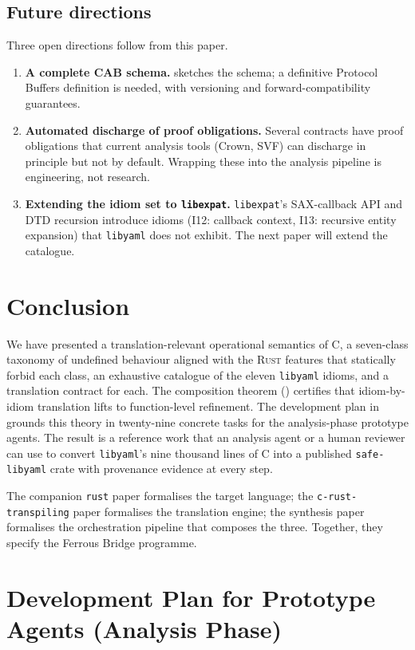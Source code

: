 \documentclass[12pt]{article}
\newcommand{\rust}{\textnormal{\textsc{Rust}}}
\newcommand{\clang}{\textnormal{\textsc{C}}}
\newcommand{\libyaml}{\texttt{libyaml}}
\newcommand{\safelibyaml}{\texttt{safe-libyaml}}
\theoremstyle{definition}
\theoremstyle{remark}
\begin{document}
\subsection{Future directions}
Three open directions follow from this paper.
\begin{enumerate}
\item \textbf{A complete CAB schema.}  sketches the schema; a definitive Protocol Buffers definition is needed, with versioning and forward-compatibility guarantees.
\item \textbf{Automated discharge of proof obligations.} Several contracts have proof obligations that current analysis tools (Crown, SVF) can discharge in principle but not by default. Wrapping these into the analysis pipeline is engineering, not research.
\item \textbf{Extending the idiom set to \texttt{libexpat}.} \texttt{libexpat}'s SAX-callback API and DTD recursion introduce idioms (I12: callback context, I13: recursive entity expansion) that \libyaml{} does not exhibit. The next paper will extend the catalogue.
\end{enumerate}

\section{Conclusion}
\label{sec:conclusion}

We have presented a translation-relevant operational semantics of \clang{}, a seven-class taxonomy of undefined behaviour aligned with the \rust{} features that statically forbid each class, an exhaustive catalogue of the eleven \libyaml{} idioms, and a translation contract for each. The composition theorem () certifies that idiom-by-idiom translation lifts to function-level refinement. The development plan in  grounds this theory in twenty-nine concrete tasks for the analysis-phase prototype agents. The result is a reference work that an analysis agent or a human reviewer can use to convert \libyaml{}'s nine thousand lines of \clang{} into a published \safelibyaml{} crate with provenance evidence at every step.

The companion \texttt{rust} paper formalises the target language; the \texttt{c-rust-transpiling} paper formalises the translation engine; the synthesis paper formalises the orchestration pipeline that composes the three. Together, they specify the Ferrous Bridge programme.

\appendix
\section{Development Plan for Prototype Agents (Analysis Phase)}
\label{app:devplan}
\end{document}
